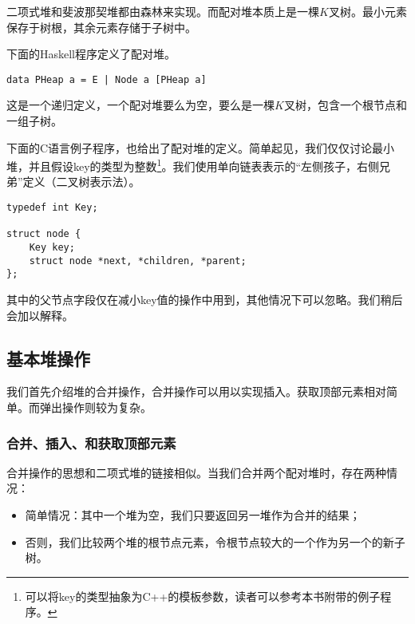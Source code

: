 \documentclass{ctexart}
\begin{document}
二项式堆和斐波那契堆都由森林来实现。而配对堆本质上是一棵$K$叉树。最小元素保存于树根，其余元素存储于子树中。

下面的Haskell程序定义了配对堆。

\lstset{language=Haskell}
\begin{lstlisting}[style=Haskell]
data PHeap a = E | Node a [PHeap a]
\end{lstlisting}

这是一个递归定义，一个配对堆要么为空，要么是一棵$K$叉树，包含一个根节点和一组子树。

下面的C语言例子程序，也给出了配对堆的定义。简单起见，我们仅仅讨论最小堆，并且假设key的类型为整数\footnote{可以将key的类型抽象为C++的模板参数，读者可以参考本书附带的例子程序。}。我们使用单向链表表示的“左侧孩子，右侧兄弟”定义（二叉树表示法\cite{CLRS}）。

\lstset{language=C}
\begin{lstlisting}
typedef int Key;

struct node {
    Key key;
    struct node *next, *children, *parent;
};
\end{lstlisting}

其中的父节点字段仅在减小key值的操作中用到，其他情况下可以忽略。我们稍后会加以解释。


\subsection{基本堆操作}

我们首先介绍堆的合并操作，合并操作可以用以实现插入。获取顶部元素相对简单。而弹出操作则较为复杂。

\subsubsection{合并、插入、和获取顶部元素}
 

合并操作的思想和二项式堆的链接相似。当我们合并两个配对堆时，存在两种情况：

\begin{itemize}
\item 简单情况：其中一个堆为空，我们只要返回另一堆作为合并的结果；

\item 否则，我们比较两个堆的根节点元素，令根节点较大的一个作为另一个的新子树。
\end{itemize}
\end{document}
